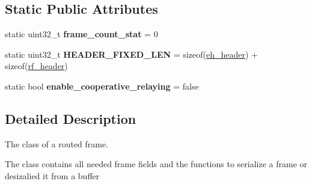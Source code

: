 \subsection*{Static Public Attributes}
\begin{DoxyCompactItemize}
\item 
\hypertarget{classRoutedFrame_ae502201806de8392281f4d7f216efb6f}{static uint32\-\_\-t {\bfseries frame\-\_\-count\-\_\-stat} = 0}\label{classRoutedFrame_ae502201806de8392281f4d7f216efb6f}

\item 
\hypertarget{classRoutedFrame_ae3db0ff9b4f6fdbe4ca404527f92b5f7}{static uint32\-\_\-t {\bfseries H\-E\-A\-D\-E\-R\-\_\-\-F\-I\-X\-E\-D\-\_\-\-L\-E\-N} = sizeof(\hyperlink{structeh__header}{eh\-\_\-header}) + sizeof(\hyperlink{structrf__header}{rf\-\_\-header})}\label{classRoutedFrame_ae3db0ff9b4f6fdbe4ca404527f92b5f7}

\item 
\hypertarget{classRoutedFrame_a2c12e04a49a8565ac0777c9d185cd876}{static bool {\bfseries enable\-\_\-cooperative\-\_\-relaying} = false}\label{classRoutedFrame_a2c12e04a49a8565ac0777c9d185cd876}

\end{DoxyCompactItemize}


\subsection{Detailed Description}
The class of a routed frame. 

The class contains all needed frame fields and the functions to serialize a frame or desizalied it from a buffer

